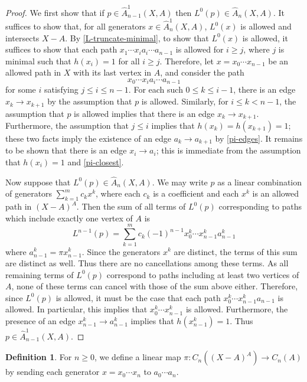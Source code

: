 \documentclass[11pt]{article}
\theoremstyle{definition}
\newtheorem{defi}[theo]{Definition}
\numberwithin{equation}{section}
\newcommand{\tA}{\widehat{A}}
\newcommand{\tAOne}{\widehat{A}^1}
\begin{document}
\begin{proof}
We first show that if $p \in \tAOne_{n-1}(X,A)$ then $L^0(p) \in \tA_{n}(X,A)$.
It suffices to show that, for all generators $x \in \tAOne_{n}(X,A)$, $L^0(x)$ is allowed and intersects $X-A$. By \cref{L-truncate-minimal}, to show that $L^0(x)$ is allowed, it suffices to show that each path $x_1 \cdots x_i a_i \cdots a_{n-1}$ is allowed for $i \geq j$, where $j$ is minimal such that $h(x_i) = 1$ for all $i \geq j$. Therefore, let $x = x_0 \cdots x_{n-1}$ be an allowed path in $X$ with its last vertex in $A$, and consider the path
\[
x_0 \cdots x_i a_i \cdots a_{n-1}
\]
for some $i$ satisfying $j \leq i \leq n-1$. For each such $0 \leq k \leq i - 1$, there is an edge $x_k \to x_{k+1}$ by the assumption that $p$ is allowed. Similarly, for $i \leq k < n - 1$, the assumption that $p$ is allowed implies that there is an edge $x_k \to x_{k+1}$. Furthermore, the assumption that $j \leq i$ implies that $h(x_k) = h(x_{k+1}) = 1$; these two facts imply the existence of an edge $a_k \to a_{k+1}$ by \cref{pi-edges}. It remains to be shown that there is an edge $x_i \to a_i$; this is immediate from the assumption that $h(x_i) = 1$ and \cref{pi-closest}.

Now suppose that $L^0(p) \in \tA_{n}(X,A)$. We may write $p$ as a linear combination of generators $\sum_{k = 1}^m c_k x^k$, where each $c_k$ is a coefficient and each $x^k$ is an allowed path in $(X-A)^A$. Then the sum of all terms of $L^0(p)$ corresponding to paths which include exactly one vertex of $A$ is
\[
L^{n-1}(p) = \sum_{k=1}^{m} c_k (-1)^{n-1} x^k_0 \cdots x^k_{n-1} a^k_{n-1}
\]
where $a^k_{n-1} = \pi x^k_{n-1}$. Since the generators $x^k$ are distinct, the terms of this sum are distinct as well. Thus there are no cancellations among these terms. As all remaining terms of $L^0(p)$ correspond to paths including at least two vertices of $A$, none of these terms can cancel with those of the sum above either. Therefore, since  $L^0(p)$ is allowed, it must be the case that each path $x^k_0 \cdots x^k_{n-1} a_{n-1}$ is allowed. In particular, this implies that $x^k_0 \cdots x^k_{n-1}$ is allowed. Furthermore, the presence of an edge $x^k_{n-1} \to a^k_{n-1}$ implies that $h(x^k_{n-1}) = 1$. Thus $p \in \tAOne_{n-1}(X,A)$.
\end{proof}

\begin{defi}\label{pi-linear-def}
For $n \geq 0$, we define a linear map $\pi \colon C_{n}((X-A)^A) \to C_{n}(A)$ by sending each generator $x = x_0 \cdots x_n$ to $a_0 \cdots a_n$.
\end{defi}
\end{document}
